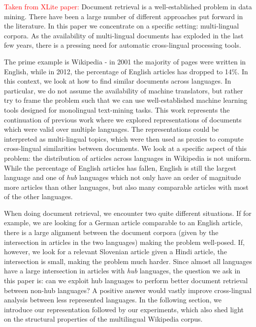 \documentclass[twoside,11pt]{article}
\newcommand{\oldText}[1]{\textcolor{red}{#1:}\color{blue}}
\begin{document}
{\oldText{Taken from XLite paper}
Document retrieval is a well-established problem in data mining. There have been a large number of different approaches put forward in the literature. In this paper we concentrate on a specific setting: multi-lingual corpora. As the availability of multi-lingual documents has exploded in the last few years, there is a pressing need for automatic cross-lingual processing tools.

The prime example is Wikipedia - in 2001 the majority of pages were written in English, while in 2012, the percentage of English articles has dropped to 14\%. In this context, we look at how to find similar documents across languages. In particular, we do not assume the availability of machine translators, but rather try to frame the problem such that we can use well-established machine learning tools designed for monolingual text-mining tasks. This work represents the continuation of previous work \cite{nips, iti, nips2, sikdd} where we explored representations of documents which were valid over multiple languages.  The representations could be interpreted as multi-lingual topics, which were then used as proxies to compute cross-lingual similarities between documents. We look at a specific aspect of this problem: the distribution of articles across languages in Wikipedia is not uniform. While the percentage of English articles has fallen, English is still the largest language and one of \emph{hub} languages which not only have an order of magnitude more articles than other languages, but also many comparable articles with most of the other languages.

When doing document retrieval, we encounter two quite different situations. If for example, we are looking for a German article comparable to an English article, there is a large alignment between the document corpora (given by the intersection in articles in the two languages) making the problem well-posed. If, however, we look for a relevant Slovenian article given a Hindi article, the intersection is small, making the problem much harder. Since almost all languages have a large intersection in articles with \emph{hub} languages, the question we ask in this paper is: can we exploit hub languages to perform better document retrieval between non-hub languages? A positive answer would vastly improve cross-lingual analysis between less represented languages. In the following section, we introduce our representation followed by our experiments, which also shed light on the structural properties of the multilingual Wikipedia corpus.
}
\end{document}
